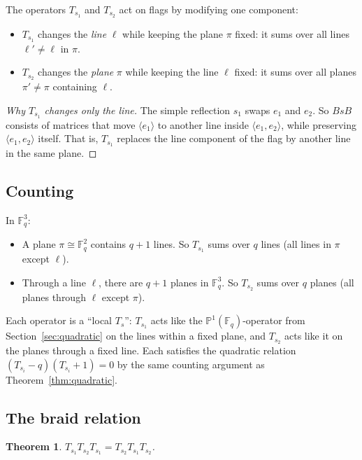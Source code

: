\documentclass[12pt,a4paper]{article}
\newtheorem{theorem}{Theorem}[section]
\theoremstyle{definition}
\theoremstyle{remark}
\newcommand{\F}{\mathbb{F}}
\newcommand{\PP}{\mathbb{P}}
\begin{document}
The operators $T_{s_1}$ and $T_{s_2}$ act on flags by modifying one
component:
\begin{itemize}
\item $T_{s_1}$ changes the \emph{line} $\ell$ while keeping the
  plane $\pi$ fixed: it sums over all lines $\ell' \neq \ell$ in
  $\pi$.
\item $T_{s_2}$ changes the \emph{plane} $\pi$ while keeping the
  line $\ell$ fixed: it sums over all planes $\pi' \neq \pi$
  containing $\ell$.
\end{itemize}

\begin{proof}[Why $T_{s_1}$ changes only the line]
The simple reflection $s_1$ swaps $e_1$ and $e_2$. So $BsB$ consists
of matrices that move $\langle e_1 \rangle$ to another line inside
$\langle e_1, e_2 \rangle$, while preserving $\langle e_1, e_2
\rangle$ itself. That is, $T_{s_1}$ replaces the line component of the
flag by another line in the same plane.
\end{proof}

\subsection{Counting}

In $\F_q^3$:
\begin{itemize}
\item A plane $\pi \cong \F_q^2$ contains $q + 1$ lines. So
  $T_{s_1}$ sums over $q$ lines (all lines in $\pi$ except $\ell$).
\item Through a line $\ell$, there are $q + 1$ planes in $\F_q^3$.
  So $T_{s_2}$ sums over $q$ planes (all planes through $\ell$
  except $\pi$).
\end{itemize}

Each operator is a ``local $T_s$'': $T_{s_1}$ acts like the
$\PP^1(\F_q)$-operator from Section~\ref{sec:quadratic} on the
lines within a fixed plane, and $T_{s_2}$ acts like it on the planes
through a fixed line. Each satisfies the quadratic relation
$(T_{s_i} - q)(T_{s_i} + 1) = 0$ by the same counting argument as
Theorem~\ref{thm:quadratic}.

\subsection{The braid relation}

\begin{theorem}\label{thm:braid}
$T_{s_1} T_{s_2} T_{s_1} = T_{s_2} T_{s_1} T_{s_2}$.
\end{theorem}
\end{document}
